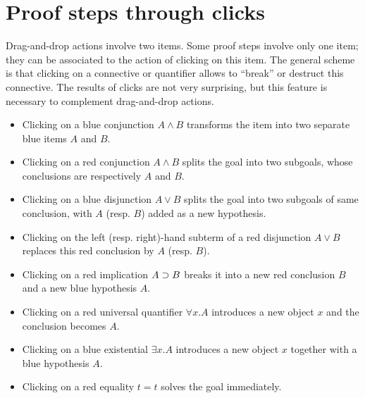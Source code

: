 \section{Proof steps through clicks}
Drag-and-drop actions involve two items. Some proof steps involve only
one item; they can be associated to the action of clicking on this
item. The general scheme is that clicking on a connective or quantifier
allows to ``break'' or destruct this connective. The results of clicks
are not very surprising, but this feature is necessary to complement
drag-and-drop actions.
\begin{itemize}
\item Clicking on a blue conjunction $A\land B$ transforms the
    item into two separate blue items $A$ and $B$.
\item Clicking on a red conjunction $A\land B$ splits the goal into
    two subgoals, whose conclusions are respectively $A$ and $B$.
\item Clicking on a blue disjunction $A\lor B$ splits the goal into two subgoals
    of same conclusion, with $A$ (resp. $B$) added as a new hypothesis.
\item Clicking on the left (resp. right)-hand subterm of a red
      disjunction $A\lor B$ replaces this red conclusion by $A$
      (resp. $B$).
\item Clicking on a red implication $A\supset B$ breaks it into a
      new red conclusion $B$ and a new blue hypothesis $A$.
\item Clicking on a red universal quantifier $\forall x.A$ introduces
  a new object $x$ and the conclusion becomes $A$.
\item Clicking on a blue existential $\exists x.A$ introduces a new
  object $x$ together with a blue hypothesis $A$.
\item Clicking on a red equality $t = t$ solves the goal immediately.
\end{itemize}

